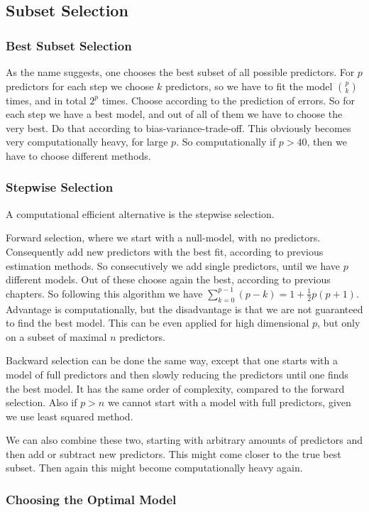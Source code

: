 \documentclass{article}
\begin{document}
\subsection{Subset Selection}
\subsubsection{Best Subset Selection}
As the name suggests, one chooses the best subset of all possible predictors. For $p$ predictors for each step we choose $k$ predictors, so we have to fit the model ${\binom{p}{k}}$ times, and in total $2^p$ times. Choose according to the prediction of errors. So for each step we have a best model, and out of all of them we have to choose the very best. Do that according to bias-variance-trade-off. This obviously becomes very computationally heavy, for large $p$. So computationally if $p>40$, then we have to choose different methods. 

\subsubsection{Stepwise Selection}
A computational efficient alternative is the stepwise selection. 

Forward selection, where we start with a null-model, with no predictors. Consequently add new predictors with the best fit, according to previous estimation methods. So consecutively we add single predictors, until we have $p$ different models. Out of these choose again the best, according to previous chapters. So following this algorithm we have $\sum_{k=0}^{p-1}(p-k)=1+\frac{1}{2}p(p+1)$. Advantage is computationally, but the disadvantage is that we are not guaranteed to find the best model. This can be even applied for high dimensional $p$, but only on a subset of maximal $n$ predictors.

Backward selection can be done the same way, except that one starts with a model of full predictors and then slowly reducing the predictors until one finds the best model. It has the same order of complexity, compared to the forward selection. Also if $p>n$ we cannot start with a model with full predictors, given we use least squared method.

We can also combine these two, starting with arbitrary amounts of predictors and then add or subtract new predictors. This might come closer to the true best subset. Then again this might become computationally heavy again.


\subsubsection{Choosing the Optimal Model}
\end{document}
